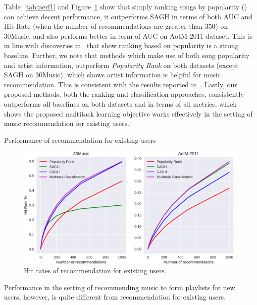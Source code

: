 Table~\ref{tab:perf1} and Figure~\ref{fig:hr1} show that simply ranking songs by popularity ()
can achieve decent performance,
it outperforms SAGH in terms of both AUC and Hit-Rate (when the number of recommendations are greater than 350) on 30Music,
and also performs better in term of AUC on AotM-2011 dataset.
This is in line with discoveries in~\cite{bonnin2013evaluating,jannach2015beyond,bonnin2015automated} that show ranking based on
popularity is a strong baseline.
Further, we note that methods which make use of both song popularity and artist information,
outperform {\it Popularity Rank} on both datasets (except SAGH on 30Music), which shows artist information is helpful for music recommendation.
This is consistent with the results reported in~\cite{bonnin2013evaluating,bonnin2015automated}.
Lastly, our proposed methods, both the ranking and classification approaches, consistently outperforms all baselines
on both datasets and in terms of all metrics, which shows the proposed multitask learning objective works effectively
in the setting of music recommendation for existing users.

\begin{table}[t]
\centering
\caption{Performance of recommendation for existing users}
\label{tab:perf1}
\resizebox{\columnwidth}{!}{

}
\end{table}


\begin{figure}[t]
\centering
\includegraphics[width=\linewidth]{fig/hitrate1.pdf}
\caption{Hit rates of recommendation for existing users.}
\label{fig:hr1}
\end{figure}


Performance in the setting of recommending music to form playlists for new users,
however, is quite different from recommendation for existing users.


